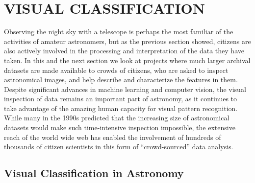 \documentclass{ar2e}
\begin{document}



\section{VISUAL CLASSIFICATION}
\label{sec:class}

Observing the night sky with a telescope is perhaps the most familiar of the
activities of amateur astronomers, but as the previous section showed, citizens
are also actively involved in the processing and interpretation of the data they
have taken.  In this and the next section we look at projects where much larger
archival datasets are made available to crowds of citizens, who are asked to
inspect astronomical images, and help describe and characterize the features in
them. Despite significant advances in machine learning and computer vision, the
visual inspection of data remains an important part of astronomy, as it
continues to take advantage of the amazing human capacity for visual pattern
recognition. While many in the 1990s predicted that the increasing size of
astronomical datasets would make such time-intensive inspection impossible, the
extensive reach of the world wide web has enabled the involvement of hundreds of
thousands of citizen scientists in this form of ``crowd-sourced'' data
analysis. 


\subsection{Visual Classification in Astronomy}
\label{sec:class:astro}
\end{document}
